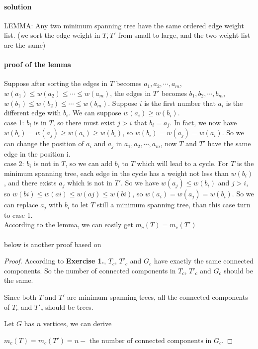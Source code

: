 \documentclass[12pt,a4]{article}
\begin{document}
\paragraph{solution}

LEMMA: Any two minimum spanning tree have the same ordered edge weight list. (we sort the edge weight in $T, T'$ from small to large, and the two weight list are the same)

\paragraph{proof of the lemma} Suppose after sorting the edges in $T$ becomes $a_1, a_2, \cdots , a_m$, $w(a_1) \leq w(a_2) \leq \cdots \leq w(a_m)$, the 
edges in $T'$ becomes $b_1, b_2, \cdots , b_m$, $w(b_1) \leq w(b_2) \leq \cdots \leq w(b_m)$. Suppose $i$ is the first number that $a_i$ is the different edge with $b_i$.
We can suppose $w(a_i) \geq w(b_i)$.\\
case 1: $b_i$ is in $T$, so there must exist $j > i$ that $b_i = a_j$. In fact, we now have $w(b_i) = w(a_j) \geq w(a_i) \geq w(b_i)$, so $w(b_i) = w(a_j) = w(a_i)$. So we can change the position 
of $a_i$ and $a_j$ in $a_1, a_2, \cdots , a_m$, now $T$ and $T'$ have the same edge in the position i.\\
case 2: $b_i$ is not in $T$, so we can add $b_i$ to $T$ which will lead to a cycle. For $T$ is the minimum spanning tree, each edge in the cycle has a weight not less than $w(b_i)$, and there exists 
$a_j$ which is not in $T'$. So we have $w(a_j) \leq w(b_i)$ and $j>i$, so $w(bi)\leq w(ai)\leq w(aj)\leq w(bi)$, so $w(a_i) = w(a_j) = w(b_i)$. So we can replace $a_j$ with $b_i$ to let $T$ still a minimum
spanning tree, than this case turn to case 1.\\
According to the lemma, we can easily get $m_c(T) = m_c(T')$\\\\
below is another proof based on 
\begin{proof}
    According to \textbf{Exercise 1.}, $T_c$, $T'_c$ and $G_c$ have exactly the same connected components. 
    So the number of connected components in $T_c$, $T'_c$ and $G_c$ should be the same.

    Since both $T$ and $T'$ are minimum spanning trees, all the connected components of $T_c$ and $T'_c$ should be trees. 

    Let $G$ has $n$ vertices, we can derive 
    
    $m_c(T) = m_c(T') = n - \mbox{ the number of connected components in } G_c$.
\end{proof}
\end{document}
